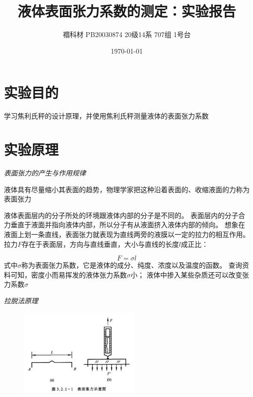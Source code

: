 \documentclass[UTF8]{ctexart}
\title{液体表面张力系数的测定：实验报告}
\author{禤科材 PB20030874 20级14系 707组 1号台}
\date{\today}
\begin{document}
    \maketitle
    \tableofcontents

    \section{实验目的}
    
        \begin{center}
            学习焦利氏秤的设计原理，并使用焦利氏秤测量液体的表面张力系数
        \end{center}

    \section{实验原理}

    \begin{center}
        \emph{表面张力的产生与作用规律}\\[0.4cm]
    \end{center}
    

    液体具有尽量缩小其表面的趋势，物理学家把这种沿着表面的、收缩液面的力称为表面张力\cite{jiangyi}

    液体表面层内的分子所处的环境跟液体内部的分子是不同的。
表面层内的分子合力垂直于液面并指向液体内部，所以分子有从液面挤入液体内部的倾向。
想象在液面上划一条直线，表面张力就表现为直线两旁的液膜以一定的拉力的相互作用。
拉力$F$存在于表面层，方向与直线垂直，大小与直线的长度$l$成正比：

\begin{equation}
    F=\sigma l
\end{equation}
式中$\sigma $称为表面张力系数，它是液体的成分、纯度、浓度以及温度的函数。
查询资料可知，密度小而易挥发的液体张力系数$\sigma $小；
液体中掺入某些杂质还可以改变张力系数$\sigma $\\[0.4cm]

\begin{center}
    \emph{拉脱法原理}\\[0.4cm]
\end{center}

\begin{figure}[ht]
    \centering 
    \includegraphics[width=6cm]{图片1.jpg}
\end{figure}
\end{document}
